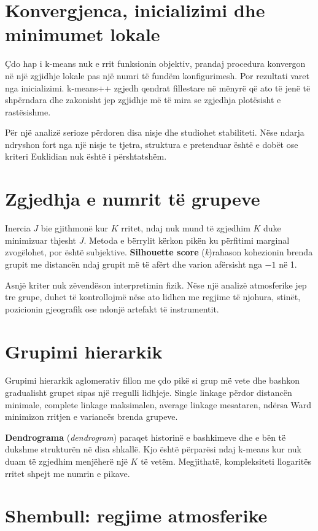 \documentclass[12pt,a4paper,oneside]{book}
\newcommand{\term}[2]{\textbf{#1} (\textit{#2})}
\begin{document}
\section{Konvergjenca, inicializimi dhe minimumet lokale}

Çdo hap i k-means nuk e rrit funksionin objektiv, prandaj procedura konvergon në një zgjidhje lokale pas një numri të fundëm konfigurimesh. Por rezultati varet nga inicializimi. k-means++ zgjedh qendrat fillestare në mënyrë që ato të jenë të shpërndara dhe zakonisht jep zgjidhje më të mira se zgjedhja plotësisht e rastësishme.

Për një analizë serioze përdoren disa nisje dhe studiohet stabiliteti. Nëse ndarja ndryshon fort nga një nisje te tjetra, struktura e pretenduar është e dobët ose kriteri Euklidian nuk është i përshtatshëm.

\section{Zgjedhja e numrit të grupeve}

Inercia $J$ bie gjithmonë kur $K$ rritet, ndaj nuk mund të zgjedhim $K$ duke minimizuar thjesht $J$. Metoda e bërrylit kërkon pikën ku përfitimi marginal zvogëlohet, por është subjektive. \term{Silhouette score} krahason kohezionin brenda grupit me distancën ndaj grupit më të afërt dhe varion afërsisht nga $-1$ në 1.

Asnjë kriter nuk zëvendëson interpretimin fizik. Nëse një analizë atmosferike jep tre grupe, duhet të kontrollojmë nëse ato lidhen me regjime të njohura, stinët, pozicionin gjeografik ose ndonjë artefakt të instrumentit.

\section{Grupimi hierarkik}

Grupimi hierarkik aglomerativ fillon me çdo pikë si grup më vete dhe bashkon gradualisht grupet sipas një rregulli lidhjeje. Single linkage përdor distancën minimale, complete linkage maksimalen, average linkage mesataren, ndërsa Ward minimizon rritjen e variancës brenda grupeve.

\term{Dendrograma}{dendrogram} paraqet historinë e bashkimeve dhe e bën të dukshme strukturën në disa shkallë. Kjo është përparësi ndaj k-means kur nuk duam të zgjedhim menjëherë një $K$ të vetëm. Megjithatë, kompleksiteti llogaritës rritet shpejt me numrin e pikave.

\section{Shembull: regjime atmosferike}
\end{document}
